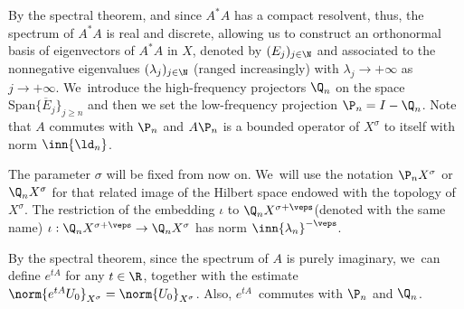 By the spectral theorem, and since $A^*A$ has a compact resolvent, thus, the spectrum of $A^*A$ is real and discrete, allowing us to construct an orthonormal basis of eigenvectors of $A^*A$ in $X$, denoted by $(E_j)_{j\in\N}$ and associated to the nonnegative eigenvalues $(\lambda_j)_{j\in \N}$ (ranged increasingly) with $\lambda_j \to+\infty$ as $j\to +\infty$. We~introduce the high-frequency projectors $\Q_n$ on the space $\overline{\text{Span}\{E_j\}_{j\geq n}}$ and then we set the low-frequency projection $\P_n=I-\Q_n$. Note that $A$ commutes with $\P_n$ and $A\P_n$ is a bounded operator of $X^{\sigma}$ to itself with norm $\inn{\ld_n}$.

The parameter $\sigma$ will be fixed from now on. We~will use the notation $\P_n X^{\sigma}$ or $\Q_n X^{\sigma}$ for that related image of the Hilbert space endowed with the topology of~$X^{\sigma}$. The restriction of the embedding $\iota$ to $\Q_n X^{\sigma+\veps}$(denoted with the same name) $\iota: \Q_n X^{\sigma+\veps}\to \Q_nX^{\sigma}$ has norm $\inn{\lambda_n}^{-\veps}$.

By the spectral theorem, since the spectrum of $A$ is purely imaginary, we~can define $e^{tA}$ for any $t\in \R$, together with the estimate $\norm{e^{tA}U_0}_{X^{\sigma}}=\norm{U_0}_{X^{\sigma}}$. Also, $e^{tA}$~commutes with $\P_n$ and $\Q_n$.

